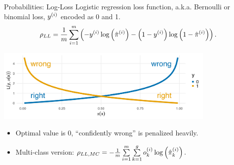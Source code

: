 \documentclass[11pt,compress,t,notes=noshow, xcolor=table]{beamer}
\begin{document}
\begin{vbframe}{Probabilities: Log-Loss}
Logistic regression loss function, a.k.a. Bernoulli or binomial loss, $y^{(i)}$ 
encoded as 0 and 1.
$$\rho_{LL} = \frac{1}{m} \sum_{i = 1}^m \left( - y^{(i)} \log \left( 
\hat \pi^{(i)} \right) - \left( 1-y^{(i)} \right) \log \left( 1 - \hat \pi^{(i)} 
\right) \right).$$
\begin{center}
\includegraphics[width=0.8\textwidth]{../supervised-classification/figure/log_loss.png}
\end{center}
\begin{itemize}
  \item Optimal value is 0, \enquote{confidently wrong} is penalized heavily.
  \item Multi-class version: $\rho_{LL, MC} = 
  - \frac{1}{m} \sum\limits_{i = 1}^m \sum\limits_{k=1}^g o_k^{(i)} \log \left( 
  \hat \pi_k^{(i)} \right).$
\end{itemize}
\end{vbframe}


\endlecture
\end{document}
